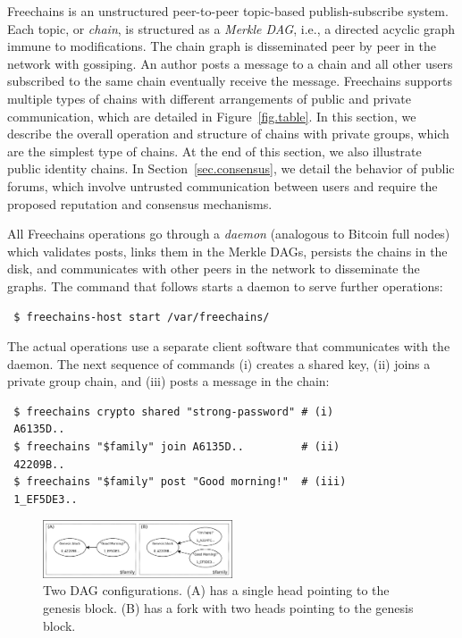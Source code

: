 \documentclass[10pt,journal,compsoc]{IEEEtran}
\newcommand{\FC}   {Freechains\xspace}
\begin{document}
\FC is an unstructured peer-to-peer topic-based publish-subscribe system.
Each topic, or \emph{chain}, is structured as a \emph{Merkle DAG}, i.e., a
directed acyclic graph immune to modifications.
The chain graph is disseminated peer by peer in the network with gossiping.
An author posts a message to a chain and all other users subscribed to the same
chain eventually receive the message.
\FC supports multiple types of chains with different arrangements of public and
private communication, which are detailed in Figure~\ref{fig.table}.
In this section, we describe the overall operation and structure of chains with
private groups, which are the simplest type of chains.
At the end of this section, we also illustrate public identity chains.
In Section~\ref{sec.consensus}, we detail the behavior of public forums, which
involve untrusted communication between users and require the proposed
reputation and consensus mechanisms.

All \FC operations go through a \emph{daemon} (analogous to Bitcoin full nodes)
which validates posts, links them in the Merkle DAGs, persists the chains in
the disk, and communicates with other peers in the network to disseminate the
graphs.
The command that follows starts a daemon to serve further operations:

{\footnotesize
\begin{verbatim}
 $ freechains-host start /var/freechains/
\end{verbatim}
}

The actual operations use a separate client software that communicates with the
daemon.
The next sequence of commands (i) creates a shared key, (ii) joins a private
group chain, and (iii) posts a message in the chain:

{\footnotesize
\begin{verbatim}
 $ freechains crypto shared "strong-password" # (i)
 A6135D..
 $ freechains "$family" join A6135D..         # (ii)
 42209B..
 $ freechains "$family" post "Good morning!"  # (iii)
 1_EF5DE3..
\end{verbatim}
}

\begin{figure}[t]
\centering
\includegraphics[width=0.5\textwidth]{family.png}
\caption{Two DAG configurations. (A) has a single head pointing to the
genesis block. (B) has a fork with two heads pointing to the genesis block.}
\label{fig.family}
\end{figure}
\end{document}
